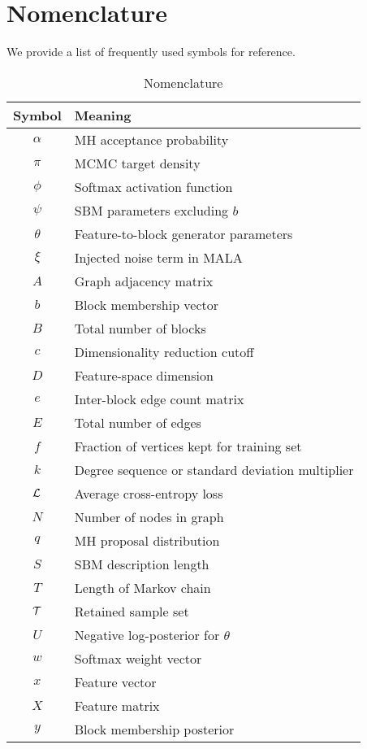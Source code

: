 \section*{Nomenclature}

We provide a list of frequently used symbols for reference.

\begin{table}[!h]
	\centering
	\caption{Nomenclature}
	\label{tab:nomenclature}
	\begin{tabular}{c|l}
			  Symbol & Meaning \\ \hline
			  $\alpha$ & MH acceptance probability\\
			  $\pi$ & MCMC target density \\
			  $\phi$ & Softmax activation function \\
			  $\psi$ & SBM parameters excluding $b$ \\
			  $\theta$ & Feature-to-block generator parameters \\
			  $\xi$ & Injected noise term in MALA\\
			  $A$ & Graph adjacency matrix \\
			  $b$ & Block membership vector\\
			  $B$ & Total number of blocks \\
			  $c$ & Dimensionality reduction cutoff \\
			  $D$ & Feature-space dimension \\
			  $e$ & Inter-block edge count matrix \\
			  $E$ & Total number of edges \\
			  $f$ & Fraction of vertices kept for training set\\
			  $k$ & Degree sequence or standard deviation multiplier\\
			  $\mathcal{L}$ & Average cross-entropy loss\\
			  $N$ & Number of nodes in graph \\
			  $q$ & MH proposal distribution\\
			  $S$ & SBM description length\\
			  $T$ & Length of Markov chain\\
			  $\mathcal{T}$ & Retained sample set\\
			  $U$ & Negative log-posterior for $\theta$ \\
			  $w$ & Softmax weight vector\\
			  $x$ & Feature vector \\
			  $X$ & Feature matrix \\
			  $y$ & Block membership posterior \\
	\end{tabular}
\end{table}
